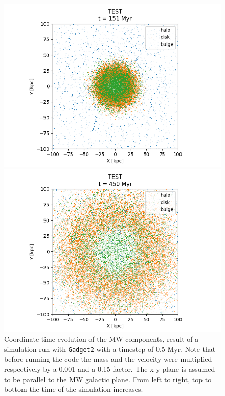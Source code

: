 \documentclass[a4paper,12pt, english]{article}
\begin{document}
\begin{figure}
\begin{minipage}{0.45\textwidth}
\includegraphics[width=1\textwidth]{simulations-plots/mw_testrun_0137.png}
\end{minipage}
\begin{minipage}{0.45\textwidth}
  \centering
\includegraphics[width=1\textwidth]{simulations-plots/mw_testrun_0409.png}
\end{minipage}
\caption{Coordinate time evolution of the MW components, result of a simulation run with \texttt{Gadget2} with a timestep of 0.5 Myr. Note that before running the code the mass and the velocity were multiplied respectively by a 0.001 and a 0.15 factor. The x-y plane is assumed to be parallel to the MW galactic plane. From left to right, top to bottom the time of the simulation increases.} 
\label{fig:mw-evolution}
\end{figure}
\end{document}

